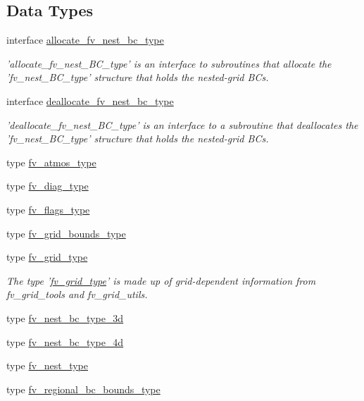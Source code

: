 \subsection*{Data Types}
\begin{DoxyCompactItemize}
\item 
interface \hyperlink{interfacefv__arrays__mod_1_1allocate__fv__nest__bc__type}{allocate\-\_\-fv\-\_\-nest\-\_\-bc\-\_\-type}
\begin{DoxyCompactList}\small\item\em 'allocate\-\_\-fv\-\_\-nest\-\_\-\-B\-C\-\_\-type' is an interface to subroutines that allocate the 'fv\-\_\-nest\-\_\-\-B\-C\-\_\-type' structure that holds the nested-\/grid B\-Cs. \end{DoxyCompactList}\item 
interface \hyperlink{interfacefv__arrays__mod_1_1deallocate__fv__nest__bc__type}{deallocate\-\_\-fv\-\_\-nest\-\_\-bc\-\_\-type}
\begin{DoxyCompactList}\small\item\em 'deallocate\-\_\-fv\-\_\-nest\-\_\-\-B\-C\-\_\-type' is an interface to a subroutine that deallocates the 'fv\-\_\-nest\-\_\-\-B\-C\-\_\-type' structure that holds the nested-\/grid B\-Cs. \end{DoxyCompactList}\item 
type \hyperlink{structfv__arrays__mod_1_1fv__atmos__type}{fv\-\_\-atmos\-\_\-type}
\item 
type \hyperlink{structfv__arrays__mod_1_1fv__diag__type}{fv\-\_\-diag\-\_\-type}
\item 
type \hyperlink{structfv__arrays__mod_1_1fv__flags__type}{fv\-\_\-flags\-\_\-type}
\item 
type \hyperlink{structfv__arrays__mod_1_1fv__grid__bounds__type}{fv\-\_\-grid\-\_\-bounds\-\_\-type}
\item 
type \hyperlink{structfv__arrays__mod_1_1fv__grid__type}{fv\-\_\-grid\-\_\-type}
\begin{DoxyCompactList}\small\item\em The type '\hyperlink{structfv__arrays__mod_1_1fv__grid__type}{fv\-\_\-grid\-\_\-type}' is made up of grid-\/dependent information from fv\-\_\-grid\-\_\-tools and fv\-\_\-grid\-\_\-utils. \end{DoxyCompactList}\item 
type \hyperlink{structfv__arrays__mod_1_1fv__nest__bc__type__3d}{fv\-\_\-nest\-\_\-bc\-\_\-type\-\_\-3d}
\item 
type \hyperlink{structfv__arrays__mod_1_1fv__nest__bc__type__4d}{fv\-\_\-nest\-\_\-bc\-\_\-type\-\_\-4d}
\item 
type \hyperlink{structfv__arrays__mod_1_1fv__nest__type}{fv\-\_\-nest\-\_\-type}
\item 
type \hyperlink{structfv__arrays__mod_1_1fv__regional__bc__bounds__type}{fv\-\_\-regional\-\_\-bc\-\_\-bounds\-\_\-type}
\end{DoxyCompactItemize}
